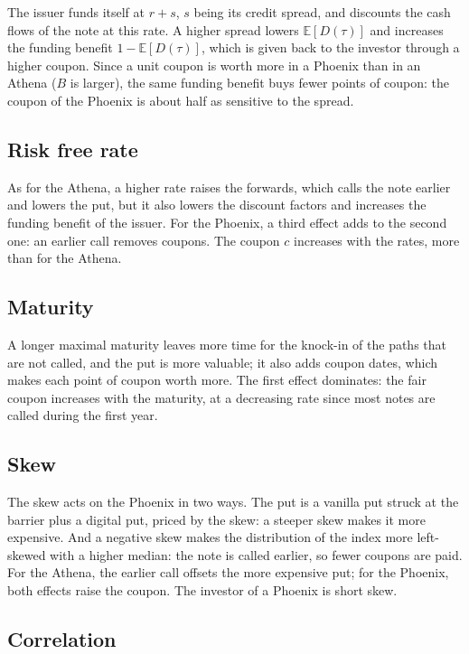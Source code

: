 \documentclass[11pt,a4paper]{article}
\newcommand{\E}{\mathbb{E}}
\begin{document}
The issuer funds itself at $r + s$, $s$ being its credit spread, and discounts the cash flows of the note at this
rate. A higher spread lowers $\E[D(\tau)]$ and increases the funding benefit $1 - \E[D(\tau)]$, which is given back
to the investor through a higher coupon. Since a unit coupon is worth more in a Phoenix than in an Athena ($B$ is
larger), the same funding benefit buys fewer points of coupon: the coupon of the Phoenix is about half as sensitive
to the spread.


\subsection*{Risk free rate}

As for the Athena, a higher rate raises the forwards, which calls the note earlier and lowers the put, but it also
lowers the discount factors and increases the funding benefit of the issuer. For the Phoenix, a third effect adds to
the second one: an earlier call removes coupons. The coupon $c$ increases with the rates, more than for the Athena.


\subsection*{Maturity}

A longer maximal maturity leaves more time for the knock-in of the paths that are not called, and the put is more
valuable; it also adds coupon dates, which makes each point of coupon worth more. The first effect dominates: the
fair coupon increases with the maturity, at a decreasing rate since most notes are called during the first year.


\subsection*{Skew}

The skew acts on the Phoenix in two ways. The put is a vanilla put struck at the barrier plus a digital put, priced
by the skew: a steeper skew makes it more expensive. And a negative skew makes the distribution of the index more
left-skewed with a higher median: the note is called earlier, so fewer coupons are paid. For the Athena, the earlier
call offsets the more expensive put; for the Phoenix, both effects raise the coupon. The investor of a Phoenix is
short skew.


\subsection*{Correlation}
\end{document}

